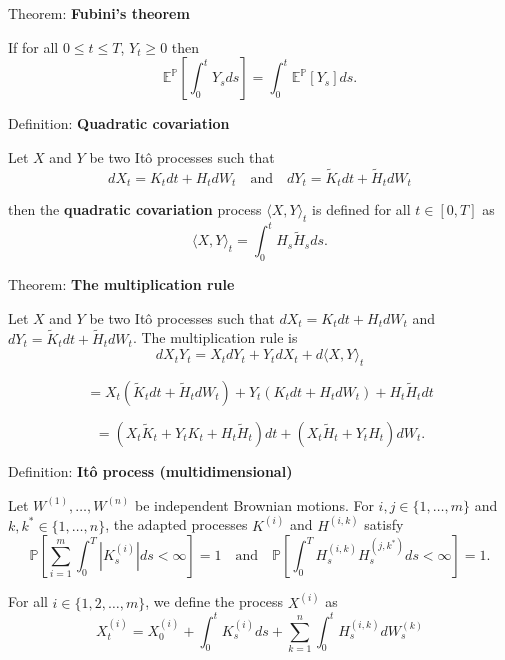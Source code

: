 \documentclass[12pt,a4paper]{article}
\begin{document}
Theorem: \textbf{Fubini's theorem}
\vspace{0.5em}

If for all $0 \leq t \leq T$, $Y_t \geq 0$ then
\[
\mathbb{E}^{\mathbb{P}} \left[ \int_0^t Y_s ds \right] = \int_0^t \mathbb{E}^{\mathbb{P}} [Y_s] ds.
\]

\vspace{1em}

Definition: \textbf{Quadratic covariation}
\vspace{0.5em}

Let $X$ and $Y$ be two Itô processes such that
\[
dX_t = K_t dt + H_t dW_t \quad \text{and} \quad dY_t = \tilde{K}_t dt + \tilde{H}_t dW_t
\]

then the \textbf{quadratic covariation} process $\langle X, Y \rangle_t$ is defined for all $t \in [0, T]$ as
\[
\langle X, Y \rangle_t = \int_0^t H_s \tilde{H}_s ds.
\]

\vspace{1em}

Theorem: \textbf{The multiplication rule}
\vspace{0.5em}

Let $X$ and $Y$ be two Itô processes such that $dX_t = K_t dt + H_t dW_t$ and $dY_t = \tilde{K}_t dt + \tilde{H}_t dW_t$. The multiplication rule is
\[
dX_t Y_t = X_t dY_t + Y_t dX_t + d\langle X, Y \rangle_t
\]

\[
= X_t \left(\tilde{K}_t dt + \tilde{H}_t dW_t\right) + Y_t (K_t dt + H_t dW_t) + H_t \tilde{H}_t dt
\]

\[
= \left(X_t \tilde{K}_t + Y_t K_t + H_t \tilde{H}_t \right) dt + \left(X_t \tilde{H}_t + Y_t H_t \right) dW_t.
\]

\vspace{1em}

Definition: \textbf{Itô process (multidimensional)}
\vspace{0.5em}

Let $W^{(1)}, \ldots, W^{(n)}$ be independent Brownian motions. For $i, j \in \{1, \ldots, m\}$ and $k, k^* \in \{1, \ldots, n\}$, the adapted processes $K^{(i)}$ and $H^{(i,k)}$ satisfy
\[
\mathbb{P} \left[\sum_{i=1}^{m} \int_0^T |K_s^{(i)}| ds < \infty\right] = 1 \quad \text{and} \quad \mathbb{P} \left[\int_0^T H_s^{(i,k)} H_s^{(j,k^*)} ds < \infty\right] = 1.
\]

For all $i \in \{1, 2, \ldots, m\}$, we define the process $X^{(i)}$ as
\[
X_t^{(i)} = X_0^{(i)} + \int_0^t K_s^{(i)} ds + \sum_{k=1}^{n} \int_0^t H_s^{(i,k)} dW_s^{(k)} \tag{12}
\]
\end{document}
